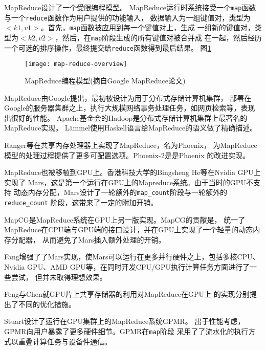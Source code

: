 MapReduce设计了一个受限编程模型。
MapReduce运行时系统接受一个\texttt{map}函数与一个\texttt{reduce}函数作为用户提供的功能输入，
数据输入为一组键值对，类型为$<k1, v1>$。首先，\texttt{map}函数被应用到每一个键值对上，生成
一组新的键值对，类型为$<k2, v2>$，然后，在\texttt{map}阶段生成的所有键值对被合并成
在一起，然后经历一个可选的排序操作，最终提交给\texttt{reduce}函数得到最后结果。
图\ref{fig:map-reduce-overview}
\begin{figure}
  \centering
  \texttt{[image: map-reduce-overview]}
  \caption[MapReduce编程模型]{MapReduce编程模型(摘自Google MapReduce论文\cite{Dean2008})}
  \label{fig:map-reduce-overview}
\end{figure}

MapReduce由Google提出，最初被设计为用于分布式存储计算机集群，
部署在Google的服务器集群之上，执行大规模网络事务处理任务，如网页检索等，表现出很好的性能。
Apache基金会的Hadoop是分布式存储计算机集群上最著名的MapReduce实现。
L\"ammel使用Haskell语言给MapReduce的语义做了精确描述。

Ranger等在共享内存处理器上实现了MapReduce，名为Phoenix，
为MapReduce模型的处理过程提供了更多可配置选项。Phoenix-2是是Phoenix
的改进实现。

MapReduce也被移植到GPU上。香港科技大学的Bingsheng He等在Nvidia GPU上实现了
Mars，这是第一个运行在GPU上的Mapreduce系统。由于当时的GPU不支持
动态内存分配，Mars设计了一轮额外的\texttt{map\_count}阶段与一轮额外的\texttt{reduce\_count}
阶段，这带来了一定的附加开销。

MapCG是MapReduce系统在GPU上另一版实现。MapCG的贡献是，
统一了MapReduce在CPU端与GPU端的接口设计，并在GPU上实现了一个轻量的动态内存分配器，
从而避免了Mars插入额外处理的开销。

Fang增强了了Mars实现，使Mars可以运行在更多并行硬件之上，包括多核CPU、
Nvidia GPU、AMD GPU等，在同时开发CPU/GPU执行计算任务方面进行了一些尝试，
但并未取得理想效果。

Feng与Chen就GPU片上共享存储器的利用对MapReduce在GPU上
的实现分别提出了不同的优化措施。

Stuart设计了运行在GPU集群上的MapReduce系统GPMR。
出于性能考虑，GPMR向用户暴露了更多硬件细节。GPMR在\texttt{map}阶段
采用了了流水化的执行方式以重叠计算任务与设备件通信。


